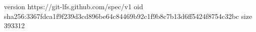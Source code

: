 version https://git-lfs.github.com/spec/v1
oid sha256:3367fdca1f9f239d3cd896be64c84469b92c1f9b8c7b13d6ff5424f8754c32bc
size 393312
